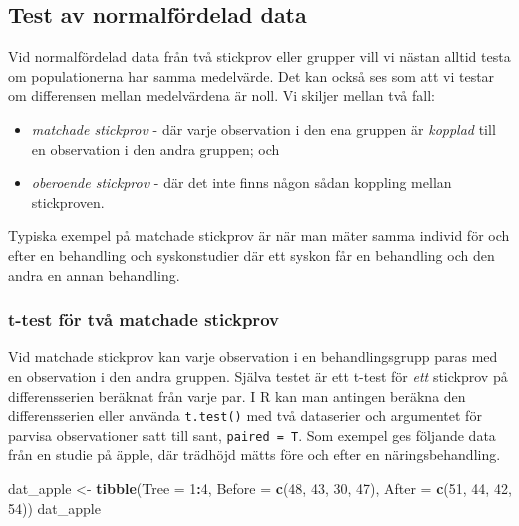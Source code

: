 \documentclass[
]{book}
\newenvironment{Shaded}{\begin{snugshade}}{\end{snugshade}}
\newcommand{\AttributeTok}[1]{\textcolor[rgb]{0.13,0.29,0.53}{#1}}
\newcommand{\DecValTok}[1]{\textcolor[rgb]{0.00,0.00,0.81}{#1}}
\newcommand{\FunctionTok}[1]{\textcolor[rgb]{0.13,0.29,0.53}{\textbf{#1}}}
\newcommand{\NormalTok}[1]{#1}
\newcommand{\OtherTok}[1]{\textcolor[rgb]{0.56,0.35,0.01}{#1}}
\newcommand{\SpecialCharTok}[1]{\textcolor[rgb]{0.81,0.36,0.00}{\textbf{#1}}}
\providecommand{\tightlist}{%
  \setlength{\itemsep}{0pt}\setlength{\parskip}{0pt}}
\theoremstyle{definition}
\theoremstyle{definition}
\theoremstyle{definition}
\theoremstyle{definition}
\theoremstyle{remark}
\begin{document}
\subsection{Test av normalfördelad data}\label{test-av-normalfuxf6rdelad-data}

Vid normalfördelad data från två stickprov eller grupper vill vi nästan alltid testa om populationerna har samma medelvärde. Det kan också ses som att vi testar om differensen mellan medelvärdena är noll. Vi skiljer mellan två fall:

\begin{itemize}
\tightlist
\item
  \emph{matchade stickprov} - där varje observation i den ena gruppen är \emph{kopplad} till en observation i den andra gruppen; och
\item
  \emph{oberoende stickprov} - där det inte finns någon sådan koppling mellan stickproven.
\end{itemize}

Typiska exempel på matchade stickprov är när man mäter samma individ för och efter en behandling och syskonstudier där ett syskon får en behandling och den andra en annan behandling.

\subsubsection{t-test för två matchade stickprov}\label{t-test-fuxf6r-tvuxe5-matchade-stickprov}

Vid matchade stickprov kan varje observation i en behandlingsgrupp paras med en observation i den andra gruppen. Själva testet är ett t-test för \emph{ett} stickprov på differensserien beräknat från varje par. I R kan man antingen beräkna den differensserien eller använda \texttt{t.test()} med två dataserier och argumentet för parvisa observationer satt till sant, \texttt{paired\ =\ T}.
Som exempel ges följande data från en studie på äpple, där trädhöjd mätts före och efter en näringsbehandling.

\begin{Shaded}
\begin{Highlighting}[]
\NormalTok{dat\_apple }\OtherTok{\textless{}{-}} \FunctionTok{tibble}\NormalTok{(}\AttributeTok{Tree =} \DecValTok{1}\SpecialCharTok{:}\DecValTok{4}\NormalTok{, }
              \AttributeTok{Before =} \FunctionTok{c}\NormalTok{(}\DecValTok{48}\NormalTok{, }\DecValTok{43}\NormalTok{, }\DecValTok{30}\NormalTok{, }\DecValTok{47}\NormalTok{), }
              \AttributeTok{After =} \FunctionTok{c}\NormalTok{(}\DecValTok{51}\NormalTok{, }\DecValTok{44}\NormalTok{, }\DecValTok{42}\NormalTok{, }\DecValTok{54}\NormalTok{))}
\NormalTok{dat\_apple}
\end{Highlighting}
\end{Shaded}
\end{document}
